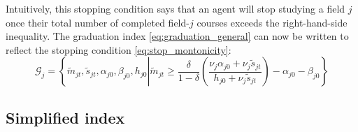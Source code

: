 \documentclass[11 pt]{article}
\newcommand{\toedit}[1]{{\color{gray}#1}}
\newcommand{\toedit}[1]{#1}
\newcommand{\pr}[1]{\left( #1 \right)}
\newcommand{\study}{m} %
\newcommand{\pass}{s}
\newcommand{\states}{\tilde{\study}_{jt}, \tilde{\pass}_{jt}, \alpha_{j0}, \beta_{j0}, h_{j0}}
\begin{document}
Intuitively, this stopping condition says that an agent will stop studying a field $j$ once their total number of completed field-$j$ courses exceeds the right-hand-side inequality.
\toedit{The graduation index \eqref{eq:graduation_general} can now be written to reflect the stopping condition \eqref{eq:stop_montonicity}:}
\begin{equation}\label{eq:graduation_monotonicity}
     \mathcal{G}_j = 
     \left\{ \states \left\vert
     \tilde{\study}_{jt} \geq \frac{\delta}{1 - \delta}
    \pr{
        \frac{\nu_j \alpha_{j0} + \nu_j \tilde{\pass}_{jt}}{h_{j0} + \nu_j \tilde{\pass}_{jt}}
    } - \alpha_{j0} - \beta_{j0}
     \right. \right\}
 \end{equation} 



\subsection{Simplified index}\label{sec:evaluating_index}
\end{document}
